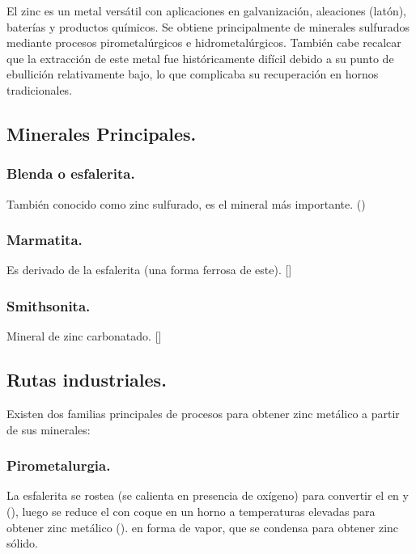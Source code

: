 \documentclass[12pt,a4paper]{article}
\begin{document}
El zinc es un metal versátil con aplicaciones en galvanización, aleaciones (latón), baterías y productos químicos. Se obtiene principalmente de minerales sulfurados mediante procesos pirometalúrgicos e hidrometalúrgicos. También cabe recalcar que la extracción de este metal fue históricamente difícil debido a su punto de ebullición relativamente bajo, lo que complicaba su recuperación en hornos tradicionales.

\subsection{Minerales Principales.}

\subsubsection{Blenda o esfalerita.}

También conocido como zinc sulfurado, es el mineral más importante. ()

\subsubsection{Marmatita.}

Es derivado de la esfalerita (una forma ferrosa de este). []

\subsubsection{Smithsonita.}

Mineral de zinc carbonatado. []

\subsection{Rutas industriales.}

Existen dos familias principales de procesos para obtener zinc metálico a partir de sus minerales:

\subsubsection{Pirometalurgia.}

La esfalerita se rostea (se calienta en presencia de oxígeno) para convertir el  en  y  (), luego se reduce el  con coque en un horno a temperaturas elevadas para obtener zinc metálico (). en forma de vapor, que se condensa para obtener zinc sólido.
\end{document}
